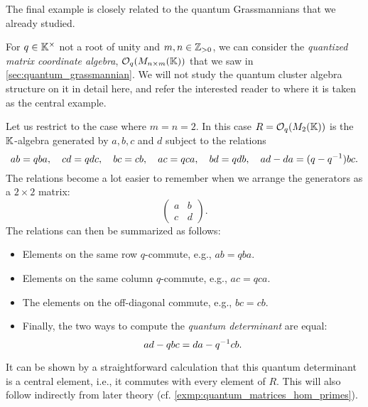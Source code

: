 The final example is closely related to the quantum Grassmannians that we already
studied.
\begin{example}\label{exmp:quantum_matrices}
	For $q \in \mathbb{K}^\times$ not a root of unity and $m, n \in \mathbb{Z}_{> 0}$, we can consider the \emph{quantized matrix coordinate algebra}, $\mathcal{O}_q(M_{n \times m}(\mathbb{K}))$ that we saw in \cref{sec:quantum_grassmannian}. We will not study the quantum cluster algebra structure on it in detail here, and refer the interested reader to \cite{GoodearlYakimov2017QCA} where it is taken as the central example.

	Let us restrict to the case where $m = n = 2$. In this case $R = \mathcal{O}_q(M_2(\mathbb{K}))$ is
	the $\mathbb{K}$-algebra generated by $a,b,c$ and $d$ subject to the relations
	\begin{equation*}
		ab =qba, \quad cd = qdc, \quad bc = cb, \quad ac = qca, \quad bd = qdb, \quad ad - da = (q-q^{-1})bc.
	\end{equation*}
	The relations become a lot easier to remember when we arrange the generators as a $2
		\times 2$ matrix:
	\begin{equation*}
		\begin{pmatrix}
			a & b \\
			c & d
		\end{pmatrix}.
	\end{equation*}
	The relations can then be summarized as follows:
	\begin{itemize}
		\item Elements on the same row $q$-commute, e.g., $ab = qba$.
		\item Elements on the same column $q$-commute, e.g., $ac = qca$.
		\item The elements on the off-diagonal commute, e.g., $bc = cb$.
		\item Finally, the two ways to compute the \emph{quantum determinant} are equal:
		      \begin{equation*}
			      ad - qbc = da -q^{-1} cb.
		      \end{equation*}
	\end{itemize}
	It can be shown by a straightforward calculation that this quantum determinant is a
	central element, i.e., it commutes with every element of $R$. This will also follow
	indirectly from later theory (cf. \cref{exmp:quantum_matrices_hom_primes}).


\end{example}
